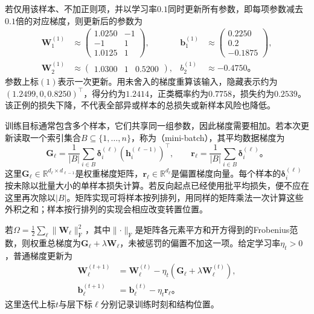 \begin{example}[一次前向与反向计算]
  若仅用该样本、不加正则项，并以学习率$0.1$同时更新所有参数，即每项参数减去$0.1$倍的对应梯度，则更新后的参数为
  \[
    \begin{aligned}
      \bm{W}_1^{(1)}&\approx
        \begin{pmatrix}1.0250&-1\\-1&1\\1.0125&1\end{pmatrix},
      &\bm{b}_1^{(1)}&\approx
        \begin{pmatrix}0.2250\\0.2\\-0.1875\end{pmatrix},\\
      \bm{W}_2^{(1)}&\approx\begin{pmatrix}1.0300&1&0.5200\end{pmatrix},
      &b_2^{(1)}&\approx-0.4750\text{。}
    \end{aligned}
  \]
  参数上标$(1)$表示一次更新。用未舍入的梯度重算该输入，隐藏表示约为$(1.2499,0,0.8250)^{\top}$，得分约为$1.2414$，正类概率约为$0.7758$，损失约为$0.2539$。该正例的损失下降，不代表全部异或样本的总损失或新样本风险也降低。
\end{example}

训练目标通常包含多个样本，它们共享同一组参数，因此梯度需要相加。若本次更新读取一个索引集合$B\subseteq\{1,\ldots,n\}$，称为（mini-batch），其平均数据梯度为
\begin{equation}
  \bm{G}_\ell=
  \frac1{|B|}\sum_{i\in B}
  \bm{\delta}_i^{(\ell)}(\bm{h}_i^{(\ell-1)})^{\top},
  \qquad
  \bm{r}_\ell=
  \frac1{|B|}\sum_{i\in B}\bm{\delta}_i^{(\ell)}\text{。}
  \label{eq:ffn-minibatch-gradients}
\end{equation}
这里$\bm{G}_\ell\in\mathbb R^{d_\ell\times d_{\ell-1}}$是权重梯度矩阵，$\bm{r}_\ell\in\mathbb R^{d_\ell}$是偏置梯度向量。每个样本的$\bm{\delta}_i^{(\ell)}$按未除以批量大小的单样本损失计算。若反向起点已经使用批平均损失，便不应在这里再次除以$|B|$。矩阵实现可将样本按列排列，用同样的矩阵乘法一次计算这些外积之和；样本按行排列的实现会相应改变转置位置。

若$\Omega=\frac12\sum_\ell\lVert\bm{W}_\ell\rVert_{\mathrm{F}}^2$，其中$\lVert\cdot\rVert_{\mathrm{F}}$是矩阵各元素平方和开方得到的Frobenius范数，则权重总梯度为$\bm{G}_\ell+\lambda\bm{W}_\ell$，未被惩罚的偏置不加这一项。给定学习率$\eta_t>0$，普通梯度更新为
\begin{equation}
  \begin{aligned}
    \bm{W}_\ell^{(t+1)}
      &=\bm{W}_\ell^{(t)}-\eta_t(\bm{G}_\ell+\lambda\bm{W}_\ell^{(t)}),\\
    \bm{b}_\ell^{(t+1)}&=\bm{b}_\ell^{(t)}-\eta_t\bm{r}_\ell\text{。}
  \end{aligned}
  \label{eq:ffn-gradient-update}
\end{equation}
这里迭代上标$t$与层下标$\ell$分别记录训练时刻和结构位置。

